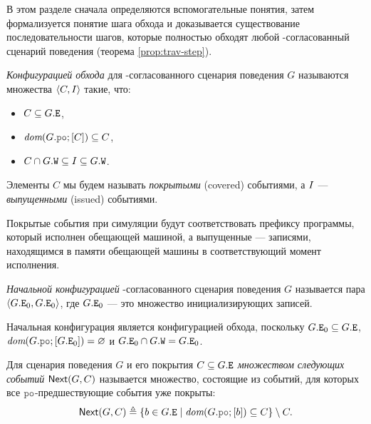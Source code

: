 В этом разделе
сначала определяются вспомогательные понятия,
затем формализуется понятие шага обхода и доказывается существование
последовательности шагов, которые полностью обходят любой \ARM-согласованный сценарий поведения (теорема \ref{prop:trav-step}).
\begin{definition}
\emph{Конфигурацией обхода} для \ARM-согласованного сценария поведения $G$
называются множества ${\langle{C, I}\rangle}$ такие, что:
\begin{itemize}
  \item $C \subseteq G.{\mathtt{E}}$,
  \item $\dom{G.\lPO;[C]}\suq C$,
  \item $C \cap G.{\mathtt{W}} \subseteq I \subseteq G.{\mathtt{W}}$.
\end{itemize}
Элементы $C$ мы будем называть \emph{покрытыми} (covered) событиями, а $I$ --- \emph{выпущенными} (issued) событиями.
\end{definition}
Покрытые события при симуляции будут соответствовать префиксу программы,
который исполнен обещающей машиной, а выпущенные --- записями, 
находящимся в памяти обещающей машины
в соответствующий момент исполнения.
\begin{definition}
\emph{Начальной конфигурацией} \ARM-согласованного сценария поведения $G$ называется пара ${\langle{G.{\mathtt{E}}_0, G.{\mathtt{E}}_0}\rangle}$,
где $G.{\mathtt{E}}_0$ --- это множество инициализирующих записей.
\end{definition}
Начальная конфигурация является конфигурацией обхода, поскольку $G.{\mathtt{E}}_0 \subseteq G.{\mathtt{E}}$, $\dom{G.\lPO;[G.\lE_0]} = \emptyset$
и $G.{\mathtt{E}}_0 \cap G.{\mathtt{W}} = G.{\mathtt{E}}_0$.
\begin{definition}
  Для 
  сценария поведения $G$ и его покрытия $C \subseteq G.{\mathtt{E}}$ \emph{множеством следующих событий} ${\sf Next}(G, C)$
  называется множество, состоящие из событий, для которых все $\lPO$-предшествующие события уже покрыты:
  \[\nextset(G, C) \defeq \{b \in G.\lE \mid \dom{G.\lPO;[b]} \suq C\} \setminus C.\]
\end{definition}
